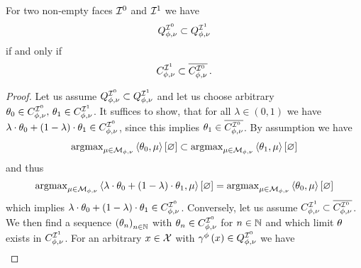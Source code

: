 \begin{lemma}\label{lem:faceSetsToMaxCones}
    For two non-empty faces $\mathcal{I}^{0}$ and $\mathcal{I}^{1}$ we have %
    \begin{align*}
        Q^{\mathcal{I}^{0}}_{\phi,\nu} \subset Q^{\mathcal{I}^{1}}_{\phi,\nu}
    \end{align*}
    if and only if
    \begin{align*}
        C_{\phi,\nu}^{\mathcal{I}^{1}} \subset \overline{C_{\phi,\nu}^{\mathcal{I}^{0}}} \, .
    \end{align*}
\end{lemma}
\begin{proof}
    \proofrightsymbol Let us assume $Q^{\mathcal{I}^{0}}_{\phi,\nu} \subset Q^{\mathcal{I}^{1}}_{\phi,\nu}$ and let us choose arbitrary $\theta_{0}\in C_{\phi,\nu}^{\mathcal{I}^{0}},\,\theta_{1}\in C_{\phi,\nu}^{\mathcal{I}^{1}}$.
        It suffices to show, that for all $\lambda\in(0,1)$ we have $\lambda\cdot\theta_{0}+(1-\lambda)\cdot\theta_{1}\in C_{\phi,\nu}^{\mathcal{I}^{0}}$, since this implies $\theta_{1}\in\overline{C_{\phi,\nu}^{\mathcal{I}^{0}}}$.
        By assumption we have
        \begin{align*}
            \mathrm{argmax}_{\mu\in\mathcal{M}_{\phi,\nu}} \left\langle \theta_{0},\mu\right\rangle \left[ \varnothing \right] \subset  \mathrm{argmax}_{\mu\in\mathcal{M}_{\phi,\nu}} \left\langle \theta_{1},\mu\right\rangle \left[ \varnothing \right]
        \end{align*}
        and thus
        \begin{align*}
            \mathrm{argmax}_{\mu\in\mathcal{M}_{\phi,\nu}} \left\langle \lambda\cdot\theta_{0}+(1-\lambda)\cdot\theta_{1},\mu\right\rangle \left[ \varnothing \right] = \mathrm{argmax}_{\mu\in\mathcal{M}_{\phi,\nu}} \left\langle \theta_{0},\mu\right\rangle \left[ \varnothing \right]
        \end{align*}
        which implies $\lambda\cdot\theta_{0}+(1-\lambda)\cdot\theta_{1}\in C_{\phi,\nu}^{\mathcal{I}^{0}}$.
    \proofleftsymbol Conversely, let us assume $C_{\phi,\nu}^{\mathcal{I}^{1}} \subset \overline{C_{\phi,\nu}^{\mathcal{I}^{0}}}$.
        We then find a sequence $\left(\theta_{n}\right)_{n\in\mathbb{N}}$ with $\theta_{n}\in C_{\phi,\nu}^{\mathcal{I}^{0}}$ for $n\in\mathbb{N}$ and which limit $\theta$ exists in $C_{\phi,\nu}^{\mathcal{I}^{1}}$.
        For an arbitrary $x\in\mathcal{X}$ with $\gamma^{\phi}\left(x\right)\in Q^{\mathcal{I}^{0}}_{\phi,\nu}$ we have
        \begin{align*}

\end{align*}
\end{proof}
